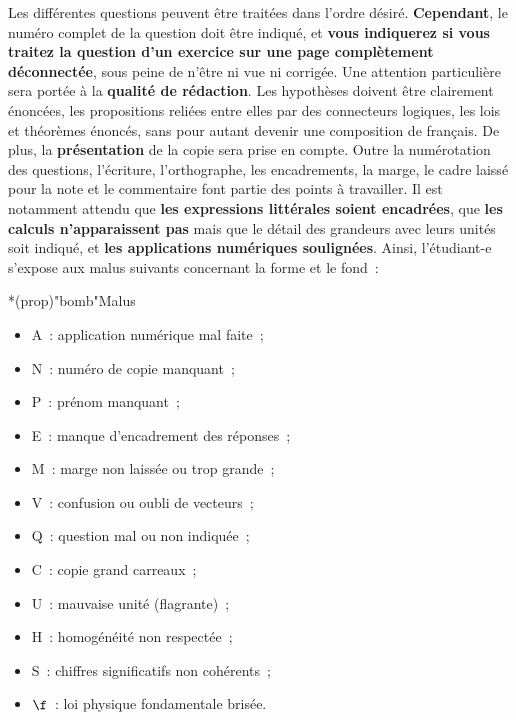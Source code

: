 \documentclass[a4paper, 10pt, garamond, oneside]{book}
\begin{document}
{Les différentes questions peuvent être traitées dans l'ordre désiré.
\textbf{Cependant}, le numéro complet de la question doit être indiqué, et
\textbf{vous indiquerez si vous traitez la question d'un exercice sur une page
	complètement déconnectée}, sous peine de n'être ni vue ni corrigée.
\bigbreak
Une attention particulière sera portée à la \textbf{qualité de rédaction}. Les
hypothèses doivent être clairement énoncées, les propositions reliées entre
elles par des connecteurs logiques, les lois et théorèmes énoncés, sans pour
autant devenir une composition de français.
\bigbreak
De plus, la \textbf{présentation} de la copie sera prise en compte. Outre la
numérotation des questions, l'écriture, l'orthographe, les encadrements, la
marge, le cadre laissé pour la note et le commentaire font partie des points à
travailler. Il est notamment attendu que \textbf{les expressions littérales
	soient encadrées}, que \textbf{les calculs n'apparaissent pas} mais que le
détail des grandeurs avec leurs unités soit indiqué, et \textbf{les applications
	numériques soulignées}.
\bigbreak
Ainsi, l'étudiant-e s'expose aux malus suivants concernant la forme et le fond~:
\begin{tcb}*(prop)"bomb"{Malus}
	\begin{minipage}{0.50\linewidth}
		\begin{itemize}
			\item A~: application numérique mal faite~;
			\item N~: numéro de copie manquant~;
			\item P~: prénom manquant~;
			\item E~: manque d'encadrement des réponses~;
			\item M~: marge non laissée ou trop grande~;
			\item V~: confusion ou oubli de vecteurs~;
		\end{itemize}
	\end{minipage}
	\begin{minipage}{0.50\linewidth}
		\begin{itemize}
			\item Q~: question mal ou non indiquée~;
			\item C~: copie grand carreaux~;
			\item U~: mauvaise unité (flagrante)~;
			\item H~: homogénéité non respectée~;
			\item S~: chiffres significatifs non cohérents~;
			\item $\f$~: loi physique fondamentale brisée.
		\end{itemize}
	\end{minipage}
\end{tcb}

}
\end{document}
